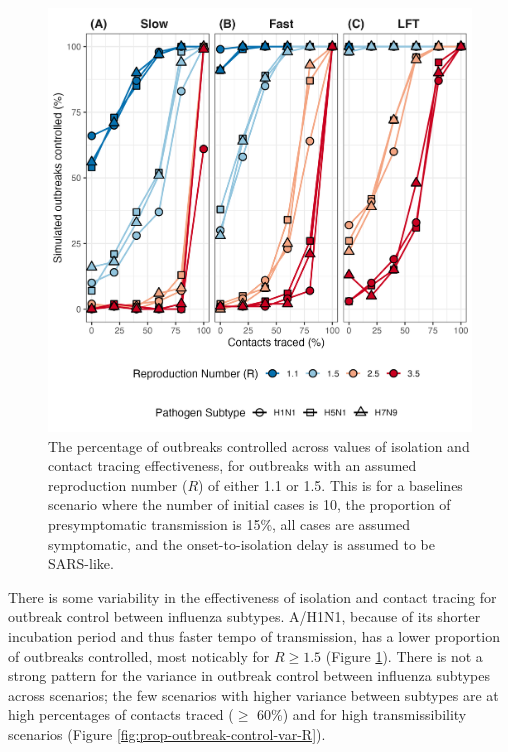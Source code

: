 \documentclass{article}
\begin{document}
\begin{figure}[ht]
\centering
\includegraphics[width=\textwidth]{../plots/prop_outbreak_control_reproduction_number.png}
\caption{The percentage of outbreaks controlled across values of isolation and contact tracing effectiveness, for outbreaks with an assumed reproduction number ($R$) of either 1.1 or 1.5. This is for a baselines scenario where the number of initial cases is 10, the proportion of presymptomatic transmission is 15\%, all cases are assumed symptomatic, and the onset-to-isolation delay is assumed to be SARS-like.}
\label{fig:prop-outbreak-control-R}
\end{figure}

There is some variability in the effectiveness of isolation and contact tracing for outbreak control between influenza subtypes. A/H1N1, because of its shorter incubation period and thus faster tempo of transmission, has a lower proportion of outbreaks controlled, most noticably for $R \geq 1.5$ (Figure \ref{fig:prop-outbreak-control-R}). There is not a strong pattern for the variance in outbreak control between influenza subtypes across scenarios; the few scenarios with higher variance between subtypes are at high percentages of contacts traced ($\geq$ 60\%) and for high transmissibility scenarios (Figure \ref{fig:prop-outbreak-control-var-R}). \\
\end{document}

